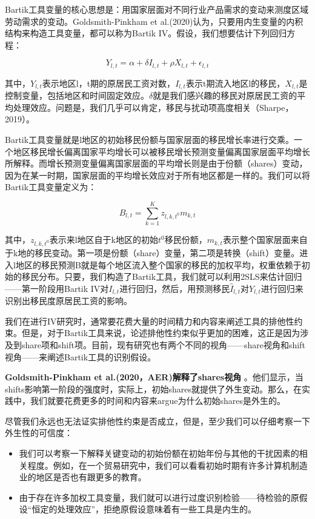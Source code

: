 \documentclass[cn,12pt,math=newtx,citestyle=gb7714-2015,bibstyle=gb7714-2015]{elegantbook}
\begin{document}
	Bartik工具变量的核心思想是：用国家层面对不同行业产品需求的变动来测度区域劳动需求的变动。Goldsmith-Pinkham et al.(2020)认为，只要用内生变量的内积结构来构造工具变量，都可以称为Bartik IV。假设，我们想要估计下列回归方程：
	
	\begin{equation}
		Y_{l,t} = \alpha + \delta I_{l,t} +\rho X_{l,t} + \epsilon_{l,t}
	\end{equation}
	
	其中，$Y_{l,t}$表示地区l，t期的原居民工资对数，$I_{l,t}$表示t期流入地区l的移民，$X_{l,t}$是控制变量，包括地区和时间固定效应。$\delta$就是我们感兴趣的移民对原居民工资的平均处理效应。问题是，我们几乎可以肯定，移民与扰动项高度相关（Sharpe，2019）。
	
	Bartik工具变量就是l地区的初始移民份额与国家层面的移民增长率进行交乘。一个地区移民增长偏离国家平均增长可以被移民增长预测变量偏离国家层面平均增长所解释。而增长预测变量偏离国家层面的平均增长则是由于份额（shares）变动，因为在某一时期，国家层面的平均增长效应对于所有地区都是一样的。我们可以将Bartik工具变量定义为：
	
	\begin{equation}
		B_{l,t} = \sum_{k=1}^{K} z_{l,k,t^0} m_{k,t}
	\end{equation}
	
	其中，$z_{l,k,t^0}$表示来l地区自于k地区的初始$t^0$移民份额，$m_{k,t}$表示整个国家层面来自于k地的移民变动。第一项是份额（share）变量，第二项是转换（shift）变量。进入l地区的移民预测B就是每个地区流入整个国家的移民的加权平均，权重依赖于初始的移民分布。只要，我们构造了Bartik工具，我们就可以利用2SLS来估计回归——第一阶段用Bartik IV对$I_{l,t}$进行回归，然后，用预测移民$\hat{I}_{l,t}$对$Y_{l,t}$进行回归来识别出移民度原居民工资的影响。
	
	我们在进行IV研究时，通常要花费大量的时间精力和内容来阐述工具的排他性约束。但是，对于Bartik工具来说，论述排他性约束似乎更加的困难，这正是因为涉及到share项和shift项。目前，现有研究也有两个不同的视角——share视角和shift视角——来阐述Bartik工具的识别假设。
	
	\textbf{Goldsmith-Pinkham et al.(2020，AER)解释了shares视角} 。他们显示，当shifts影响第一阶段的强度时，实际上，初始shares就提供了外生变动。那么，在实践中，我们就要花费更多的时间和内容来argue为什么初始shares是外生的。
	
	尽管我们永远也无法证实排他性约束是否成立，但是，至少我们可以仔细考察一下外生性的可信度：
	
	\begin{itemize}
		\item 我们可以考察一下解释关键变动的初始份额在初始年份与其他的干扰因素的相关程度。例如，在一个贸易研究中，我们可以看看初始时期有许多计算机制造业的地区是否也有跟更多的教育。
		\item 由于存在许多加权工具变量，我们就可以进行过度识别检验——待检验的原假设“恒定的处理效应”，拒绝原假设意味着有一些工具是内生的。
	\end{itemize}
	
\end{document}
